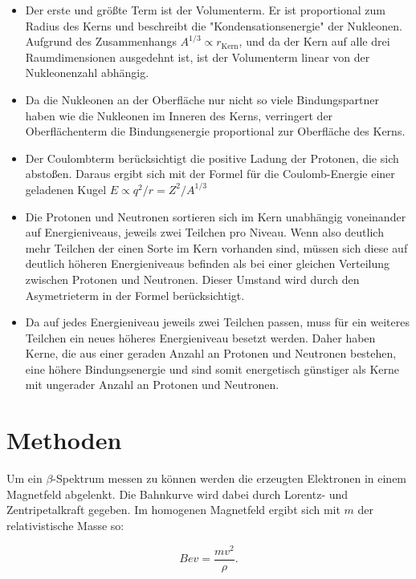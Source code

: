 \begin{itemize}
\item Der erste und größte Term ist der Volumenterm. Er ist proportional zum Radius des Kerns und beschreibt die "Kondensationsenergie" der Nukleonen. Aufgrund des Zusammenhangs $A^{1/3} \propto r_\text{Kern}$, und da der Kern auf alle drei Raumdimensionen ausgedehnt ist, ist der Volumenterm linear von der Nukleonenzahl abhängig.

\item Da die Nukleonen an der Oberfläche nur nicht so viele Bindungspartner haben wie die Nukleonen im Inneren des Kerns, verringert der Oberflächenterm die Bindungsenergie proportional zur Oberfläche des Kerns.

\item Der Coulombterm berücksichtigt die positive Ladung der Protonen, die sich abstoßen. Daraus ergibt sich mit der Formel für die Coulomb-Energie einer geladenen Kugel $E \propto q^2/r = Z^2/A^{1/3}$

\item Die Protonen und Neutronen sortieren sich im Kern unabhängig voneinander auf Energieniveaus, jeweils zwei Teilchen pro Niveau. Wenn also deutlich mehr Teilchen der einen Sorte im Kern vorhanden sind, müssen sich diese auf deutlich höheren Energieniveaus befinden als bei einer gleichen Verteilung zwischen Protonen und Neutronen. Dieser Umstand wird durch den Asymetrieterm in der Formel berücksichtigt.

\item Da auf jedes Energieniveau jeweils zwei Teilchen passen, muss für ein weiteres Teilchen ein neues höheres Energieniveau besetzt werden. Daher haben Kerne, die aus einer geraden Anzahl an Protonen und Neutronen bestehen, eine höhere Bindungsenergie und sind somit energetisch günstiger als Kerne mit ungerader Anzahl an Protonen und Neutronen.
\end{itemize}

\section{Methoden}
Um ein $\beta$-Spektrum messen zu können werden die erzeugten Elektronen in einem Magnetfeld abgelenkt. Die Bahnkurve wird dabei durch Lorentz- und Zentripetalkraft gegeben. Im homogenen Magnetfeld ergibt sich mit $m$ der relativistische Masse so:

\begin{equation}
Bev = \frac{mv^2}{\rho}.
\label{bfeld}
\end{equation}

